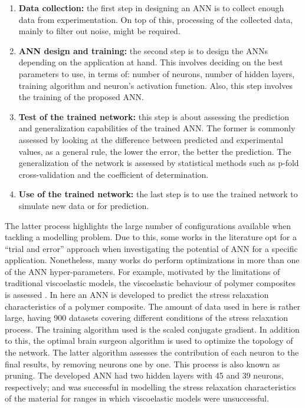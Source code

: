 \begin{enumerate}
    \item \textbf{Data collection:} the first step in designing an ANN is to collect enough data from experimentation. On top of this, processing of the collected data, mainly to filter out noise, might be required.
    \item \textbf{ANN design and training:} the second step is to design the ANNs depending on the application at hand. This involves deciding on the best parameters to use, in terms of: number of neurons, number of hidden layers, training algorithm and neuron's activation function. Also, this step involves the training of the proposed ANN.
    \item \textbf{Test of the trained network:} this step is about assessing the prediction and generalization capabilities of the trained ANN. The former is commonly assessed by looking at the difference between predicted and experimental values, as a general rule, the lower the error, the better the prediction. The generalization of the network is assessed by statistical methods such as p-fold cross-validation and the coefficient of determination.
    \item \textbf{Use of the trained network:} the last step is to use the trained network to simulate new data or for prediction.
\end{enumerate}

The latter process highlights the large number of configurations available when tackling a modelling problem. Due to this, some works in the literature opt for a ``trial and error'' approach when investigating the potential of ANN for a specific application. Nonetheless, many works do perform optimizations in more than one of the ANN hyper-parameters. For example, motivated by the limitations of traditional viscoelastic models, the viscoelastic behaviour of polymer composites is assessed \cite{al2006prediction}. In here an ANN is developed to predict the stress relaxation characteristics of a polymer composite. The amount of data used in here is rather large, having 900 datasets covering different conditions of the stress relaxation process. The training algorithm used is the scaled conjugate gradient. In addition to this, the optimal brain surgeon algorithm is used to optimize the topology of the network. The latter algorithm assesses the contribution of each neuron to the final results, by removing neurons one by one. This process is also known as pruning. The developed ANN had two hidden layers with 45 and 39 neurons, respectively; and was successful in modelling the stress relaxation characteristics of the material for ranges in which viscoelastic models were unsuccessful.

